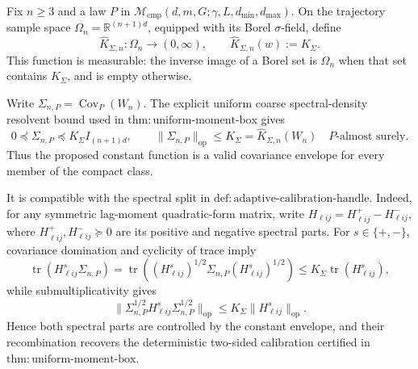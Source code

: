 Fix \(n\geq3\) and a law \(P\) in
\(\mathcal M_{\mathrm{cmp}}(d,m,G;\gamma,L,d_{\min},d_{\max})\).  On the
trajectory sample space \(\Omega_n=\mathbb R^{(n+1)d}\), equipped with its
Borel \(\sigma\)-field, define
\[
 \widehat K_{\Sigma,n}:\Omega_n\longrightarrow(0,\infty),
 \qquad
 \widehat K_{\Sigma,n}(w):=K_\Sigma.
\]
This function is measurable: the inverse image of a Borel set is
\(\Omega_n\) when that set contains \(K_\Sigma\), and is empty otherwise.

Write \(\Sigma_{n,P}=\operatorname{Cov}_P(W_n)\).  The explicit uniform
coarse spectral-density resolvent bound used in
\(\mathrm{thm{:}uniform\mbox{-}moment\mbox{-}box}\) gives
\[
 0\preceq\Sigma_{n,P}\preceq K_\Sigma I_{(n+1)d},
 \qquad
 \|\Sigma_{n,P}\|_{\mathrm{op}}
 \leq K_\Sigma=\widehat K_{\Sigma,n}(W_n)
 \quad P\text{-almost surely}.
\]
Thus the proposed constant function is a valid covariance envelope for
every member of the compact class.

It is compatible with the spectral split in
\(\mathrm{def{:}adaptive\mbox{-}calibration\mbox{-}handle}\).  Indeed,
for any symmetric lag-moment quadratic-form matrix, write
\(H_{\ell ij}=H_{\ell ij}^{+}-H_{\ell ij}^{-}\), where
\(H_{\ell ij}^{+},H_{\ell ij}^{-}\succeq0\) are its positive and negative
spectral parts.  For \(s\in\{+,-\}\), covariance domination and cyclicity
of trace imply
\[
 \operatorname{tr}(H_{\ell ij}^{s}\Sigma_{n,P})
 =\operatorname{tr}\!\left((H_{\ell ij}^{s})^{1/2}
 \Sigma_{n,P}(H_{\ell ij}^{s})^{1/2}\right)
 \leq K_\Sigma\operatorname{tr}(H_{\ell ij}^{s}),
\]
while submultiplicativity gives
\[
 \bigl\|\Sigma_{n,P}^{1/2}H_{\ell ij}^{s}
 \Sigma_{n,P}^{1/2}\bigr\|_{\mathrm{op}}
 \leq K_\Sigma\|H_{\ell ij}^{s}\|_{\mathrm{op}}.
\]
Hence both spectral parts are controlled by the constant envelope, and
their recombination recovers the deterministic two-sided calibration
certified in \(\mathrm{thm{:}uniform\mbox{-}moment\mbox{-}box}\).

